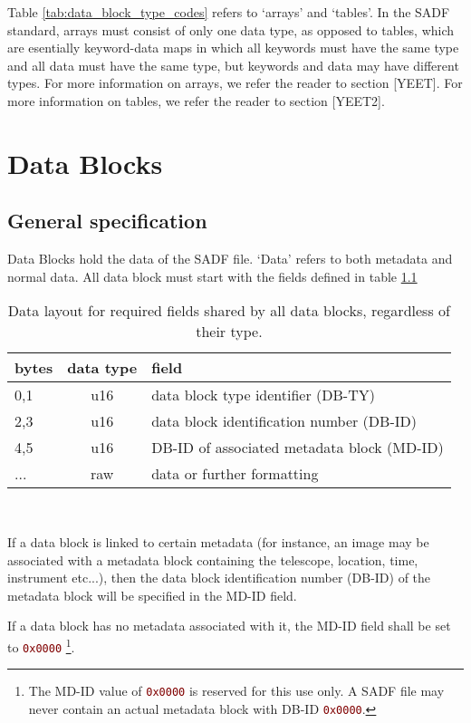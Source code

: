 \documentclass[pagesize=a4]{tufte-book}
\newcommand{\hlred}[1]{\textcolor{Maroon}{#1}}%
\newcommand{\hex}[1]{\hlred{\texttt{#1}}}%
\begin{document}
Table \ref{tab:data_block_type_codes} refers to `arrays' and `tables'. In the SADF standard, arrays must consist of only one data type, as opposed to tables, which are esentially keyword-data maps in which all keywords must have the same type and all data must have the same type, but keywords and data may have different types.
For more information on arrays, we refer the reader to section [YEET]. For more information on tables, we refer the reader to section [YEET2].

\chapter{Data Blocks}
\section{General specification}
\label{general_db_spec}
Data Blocks hold the data of the SADF file.  `Data' refers to both metadata and normal data. All data block must start with the fields defined in table \ref{tab:db_required_fields}

\begin{table}[ht]
	\centering
	\selectfont
	\begin{tabular}{lcl}
		\toprule
		bytes & data type & field\\
		\midrule
		0,1 & u16 & data block type identifier (DB-TY)\\
		2,3 & u16 & data block identification number (DB-ID)\\
		4,5 & u16 & DB-ID of associated metadata block (MD-ID)\\
		... & raw & data or further formatting\\
		\bottomrule
	\end{tabular}
	~\label{tab:db_required_fields}
	\caption{Data layout for required fields shared by all data blocks, regardless of their type.}	
\end{table}
\vspace{5mm}

If a data block is linked to certain metadata (for instance, an image may be 
associated with a metadata block containing the telescope, location, time, instrument etc...), then the data block identification number (DB-ID) of the metadata block will be specified in the MD-ID field.

If a data block has no metadata associated with it, the MD-ID field shall be set to \hex{0x0000} \footnote{The MD-ID value of \hex{0x0000} is reserved for this use only. A SADF file may never contain an actual metadata block with DB-ID \hex{0x0000}.}.
\end{document}
